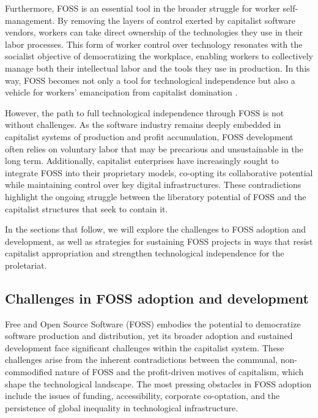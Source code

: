 \begin{refsection}
Furthermore, FOSS is an essential tool in the broader struggle for worker self-management. By removing the layers of control exerted by capitalist software vendors, workers can take direct ownership of the technologies they use in their labor processes. This form of worker control over technology resonates with the socialist objective of democratizing the workplace, enabling workers to collectively manage both their intellectual labor and the tools they use in production. In this way, FOSS becomes not only a tool for technological independence but also a vehicle for workers' emancipation from capitalist domination \cite[pp.~77-78]{dean2012}.

However, the path to full technological independence through FOSS is not without challenges. As the software industry remains deeply embedded in capitalist systems of production and profit accumulation, FOSS development often relies on voluntary labor that may be precarious and unsustainable in the long term. Additionally, capitalist enterprises have increasingly sought to integrate FOSS into their proprietary models, co-opting its collaborative potential while maintaining control over key digital infrastructures. These contradictions highlight the ongoing struggle between the liberatory potential of FOSS and the capitalist structures that seek to contain it.

In the sections that follow, we will explore the challenges to FOSS adoption and development, as well as strategies for sustaining FOSS projects in ways that resist capitalist appropriation and strengthen technological independence for the proletariat.

\subsection{Challenges in FOSS adoption and development}

Free and Open Source Software (FOSS) embodies the potential to democratize software production and distribution, yet its broader adoption and sustained development face significant challenges within the capitalist system. These challenges arise from the inherent contradictions between the communal, non-commodified nature of FOSS and the profit-driven motives of capitalism, which shape the technological landscape. The most pressing obstacles in FOSS adoption include the issues of funding, accessibility, corporate co-optation, and the persistence of global inequality in technological infrastructure.


\end{refsection}
